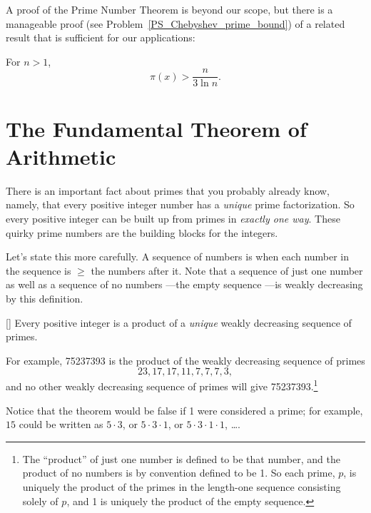 A proof of the Prime Number Theorem is beyond our scope, but there is
a manageable proof (see Problem~\ref{PS_Chebyshev_prime_bound}) of a
related result that is sufficient for our applications:
\begin{theorem}
For $n >1$,
\[
\pi(x) > \frac{n}{3 \ln n}.
\]
\end{theorem}

\begin{problems}
\homeworkproblems
{}
\end{problems}

\section{The Fundamental Theorem of Arithmetic}\label{fundamental_theorem_sec}

There is an important fact about primes that you probably already
know, namely, that every positive integer number has a \emph{unique}
prime factorization.  So every positive integer can be built up from
primes in \emph{exactly one way}.  These quirky prime numbers are the
building blocks for the integers.

Let's state this more carefully.  A sequence of numbers is
\emph{} when each number in the sequence is
$\ge$ the numbers after it.  Note that a sequence of just one number
as well as a sequence of no numbers ---the empty sequence ---is weakly
decreasing by this definition.

\begin{theorem}\label{thm:unique_factor}[]
Every positive integer is a product of a \emph{unique} weakly
decreasing sequence of primes.
\end{theorem}

For example, 75237393 is the product of the weakly decreasing sequence
of primes
\[
23, 17, 17, 11, 7, 7, 7, 3,
\]
and no other weakly decreasing sequence of primes will give
75237393.\footnote{The ``product'' of just one number is defined to be
  that number, and the product of no numbers is by convention defined
  to be 1.  So each prime, $p$, is uniquely the product of the primes
  in the length-one sequence consisting solely of $p$, and 1 is
  uniquely the product of the empty sequence.}

Notice that the theorem would be false if 1 were considered a prime;
for example, $15$ could be written as $5 \cdot 3$, or $5 \cdot 3 \cdot
1$, or $5 \cdot 3 \cdot 1 \cdot 1$, \dots.

